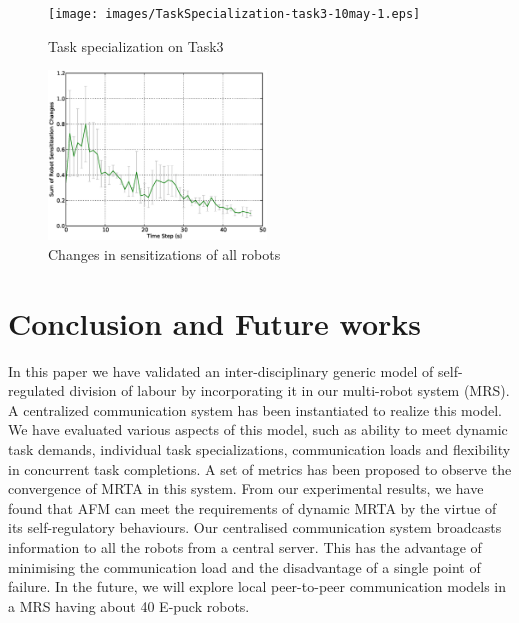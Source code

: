 \documentclass{llncs}
\begin{document}
\begin{figure}
\begin{minipage}[t]{0.48\linewidth}
\centering
\texttt{[image: images/TaskSpecialization-task3-10may-1.eps]}
\caption{\small Task specialization on Task3}
\label{fig:single-robot-sensitizations} %
\end{minipage} 
\hspace{0.5cm}
\begin{minipage}[t]{0.48\linewidth}
\centering
\includegraphics[height=4.5cm, angle=0]
{images/global/RobotSensitizationStat-Total-50steps.eps}
\caption{\small Changes in sensitizations of all robots}
\label{fig:sensitization-stat} %
\end{minipage}
\end{figure}
\section{Conclusion and Future works}
\label{sec:conc}
In this paper we have validated an inter-disciplinary generic model of self-regulated division of labour by incorporating it in our multi-robot system (MRS). A centralized communication system has been instantiated to realize this model. We have evaluated various aspects of this model, such as ability to meet dynamic task demands, individual task specializations, communication loads and flexibility in concurrent task completions. A set of metrics has been proposed to observe the convergence of MRTA in this system. From our experimental results, we have found that AFM can meet the requirements of dynamic MRTA by the virtue of its self-regulatory behaviours. Our centralised communication system broadcasts information to all the robots from a central server. This has the advantage of minimising the communication load and the disadvantage of a single point of failure. In the future, we will explore local peer-to-peer communication models in a MRS having about 40 E-puck robots.
\bigskip
\end{document}
